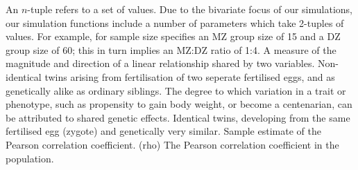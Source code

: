 % 
% 
%

 An $n$-tuple refers to a set of values.  Due to the bivariate focus of our simulations, our simulation functions include a number of parameters which take 2-tuples of values.  For example, for sample size  specifies an MZ group size of 15 and a DZ group size of 60; this in turn implies an MZ:DZ ratio of 1:4.
 A measure of the magnitude and direction of a linear relationship shared by two variables.
 Non-identical twins arising from fertilisation of two seperate fertilised eggs, and as genetically alike as ordinary siblings.
 The degree to which variation in a trait or phenotype, such as propensity to gain body weight, or become a centenarian, can be attributed to shared genetic effects.
 Identical twins, developing from the same fertilised egg (zygote) and genetically very similar.
 Sample estimate of the Pearson correlation coefficient.
\runinhead{$\rho$} (rho) The Pearson correlation coefficient in the population.
